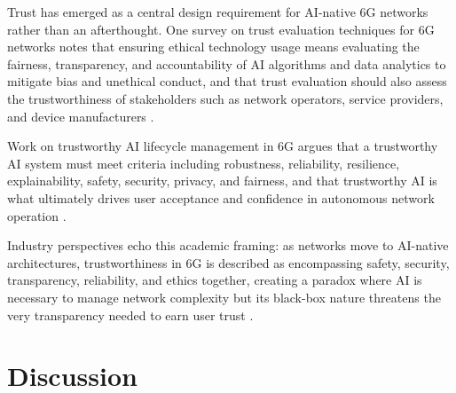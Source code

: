 Trust has emerged as a central design requirement for AI-native 6G networks rather
than an afterthought. One survey on trust evaluation techniques for 6G networks notes
that ensuring ethical technology usage means evaluating the fairness, transparency,
and accountability of AI algorithms and data analytics to mitigate bias and unethical
conduct, and that trust evaluation should also assess the trustworthiness of
stakeholders such as network operators, service providers, and device manufacturers
\cite{trusteval2024}.

Work on trustworthy AI lifecycle management in 6G argues that a trustworthy AI
system must meet criteria including robustness, reliability, resilience,
explainability, safety, security, privacy, and fairness, and that trustworthy AI is
what ultimately drives user acceptance and confidence in autonomous network
operation \cite{reason2025}.

Industry perspectives echo this academic framing: as networks move to AI-native
architectures, trustworthiness in 6G is described as encompassing safety, security,
transparency, reliability, and ethics together, creating a paradox where AI is
necessary to manage network complexity but its black-box nature threatens the very
transparency needed to earn user trust \cite{ericsson2026}.




\section{Discussion}





